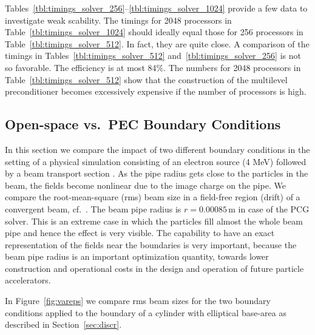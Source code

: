\documentclass[a4paper,10pt,3p,final,pdftex]{elsarticle}
\begin{document}
Tables~\ref{tbl:timings_solver_256}--\ref{tbl:timings_solver_1024}
provide a few data to investigate weak scability.  The timings for 2048
processors in Table~\ref{tbl:timings_solver_1024} should ideally equal
those for 256 processors in Table~\ref{tbl:timings_solver_512}.  In
fact, they are quite close.  A comparison of the timings in
Tables~\ref{tbl:timings_solver_512} and~\ref{tbl:timings_solver_256} is
not so favorable.  The efficiency is at most 84\%.  The numbers for 2048
processors in Table~\ref{tbl:timings_solver_512} show that the
construction of the multilevel preconditioner becomes excessively
expensive if the number of processors is high.

\subsection{Open-space vs.\ PEC Boundary Conditions} 
\label{sec:physrun}

In this section we compare the impact of two different boundary
conditions in the setting of a physical simulation consisting of an
electron source (4 MeV) followed by a beam transport section
\cite{schiet:08}.  As the pipe radius gets close to the particles in the
beam, the fields become nonlinear due to the image charge on the pipe.
We compare the root-mean-square (rms) beam size in a field-free region
(drift) of a convergent beam, cf.~\cite[pp.171ff]{wied:07}.  The beam
pipe radius is $r = 0.00085$\,m in case of the PCG solver.  This is an
extreme case in which the particles fill almost the whole beam pipe and
hence the effect is very visible.  The capability to have an exact
representation of the fields near the boundaries is very important,
because the beam pipe radius is an important optimization quantity,
towards lower construction and operational costs in the design and
operation of future particle accelerators.

In Figure~\ref{fig:vareps} we compare rms beam sizes for the two
boundary conditions applied to the boundary of a cylinder with
elliptical base-area as described in Section~\ref{sec:discr}.

\end{document}
